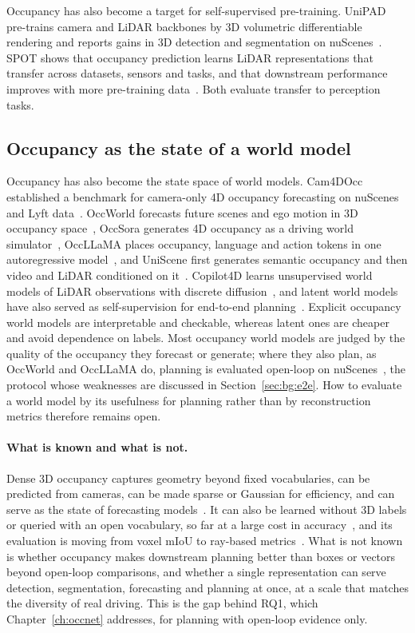 Occupancy has also become a target for self-supervised pre-training. UniPAD pre-trains camera and LiDAR backbones by 3D volumetric differentiable rendering and reports gains in 3D detection and segmentation on nuScenes~\cite{yang2024unipad}. SPOT shows that occupancy prediction learns LiDAR representations that transfer across datasets, sensors and tasks, and that downstream performance improves with more pre-training data~\cite{yan2025spot}. Both evaluate transfer to perception tasks.

\subsection{Occupancy as the state of a world model}

Occupancy has also become the state space of world models. Cam4DOcc established a benchmark for camera-only 4D occupancy forecasting on nuScenes and Lyft data~\cite{ma2024cam4docc}. OccWorld forecasts future scenes and ego motion in 3D occupancy space~\cite{zheng2024occworld}, OccSora generates 4D occupancy as a driving world simulator~\cite{wang2026occsora}, OccLLaMA places occupancy, language and action tokens in one autoregressive model~\cite{wei2024occllama}, and UniScene first generates semantic occupancy and then video and LiDAR conditioned on it~\cite{li2025uniscene}. Copilot4D learns unsupervised world models of LiDAR observations with discrete diffusion~\cite{zhang2024copilot4d}, and latent world models have also served as self-supervision for end-to-end planning~\cite{li2025law}. Explicit occupancy world models are interpretable and checkable, whereas latent ones are cheaper and avoid dependence on labels. Most occupancy world models are judged by the quality of the occupancy they forecast or generate; where they also plan, as OccWorld and OccLLaMA do, planning is evaluated open-loop on nuScenes~\cite{zheng2024occworld,wei2024occllama}, the protocol whose weaknesses are discussed in Section~\ref{sec:bg:e2e}. How to evaluate a world model by its usefulness for planning rather than by reconstruction metrics therefore remains open.

\paragraph{What is known and what is not.} Dense 3D occupancy captures geometry beyond fixed vocabularies, can be predicted from cameras, can be made sparse or Gaussian for efficiency, and can serve as the state of forecasting models~\cite{wei2023surroundocc,tian2023occ3d,liu2024sparseocc,huang2024gaussianformer,zheng2024occworld}. It can also be learned without 3D labels or queried with an open vocabulary, so far at a large cost in accuracy~\cite{huang2024selfocc,vobecky2023pop3d,jiang2025gausstr}, and its evaluation is moving from voxel mIoU to ray-based metrics~\cite{liu2024sparseocc}. What is not known is whether occupancy makes downstream planning better than boxes or vectors beyond open-loop comparisons, and whether a single representation can serve detection, segmentation, forecasting and planning at once, at a scale that matches the diversity of real driving. This is the gap behind RQ1, which Chapter~\ref{ch:occnet} addresses, for planning with open-loop evidence only.

